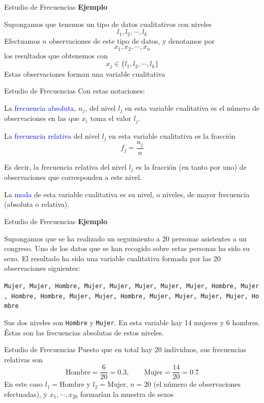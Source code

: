 \documentclass[
  ignorenonframetext,
  aspectratio=169]{beamer}
\newcommand\blue[1]{\textcolor{blue}{#1}}
\begin{document}
\begin{frame}{Estudio de Frecuencias}
\protect\hypertarget{estudio-de-frecuencias-1}{}
\textbf{Ejemplo}

Supongamos que tenemos un tipo de datos cualitativos con niveles
\[l_1,l_2,\cdots,l_k\] Efectuamos \(n\) observaciones de este tipo de
datos, y denotamos por \[x_1,x_2,\cdots,x_n\] los resultados que
obtenemos con \[x_j\in\{l_1, l_2,\cdots, l_k\}\] Estas observaciones
forman una variable cualitativa
\end{frame}

\begin{frame}{Estudio de Frecuencias}
\protect\hypertarget{estudio-de-frecuencias-2}{}
Con estas notaciones:

La \blue{frecuencia absoluta}, \(n_j\), del nivel \(l_j\) en esta
variable cualitativa es el número de observaciones en las que \(x_i\)
toma el valor \(l_j\).

La \blue{frecuencia relativa} del nivel \(l_j\) en esta variable
cualitativa es la fracción \[f_j = \frac{n_j}{n}\]

Es decir, la frecuencia relativa del nivel \(l_j\) es la fracción (en
tanto por uno) de observaciones que corresponden a este nivel.

La \blue{moda} de esta variable cualitativa es su nivel, o niveles, de
mayor frecuencia (absoluta o relativa).
\end{frame}

\begin{frame}[fragile]{Estudio de Frecuencias}
\protect\hypertarget{estudio-de-frecuencias-3}{}
\textbf{Ejemplo}

Supongamos que se ha realizado un seguimiento a 20 personas asistentes a
un congreso. Uno de los datos que se han recogido sobre estas personas
ha sido su sexo. El resultado ha sido una variable cualitativa formada
por las 20 observaciones siguientes:

\texttt{Mujer,\ Mujer,\ Hombre,\ Mujer,\ Mujer,\ Mujer,\ Mujer,\ Mujer,\ Hombre,\ Mujer,\ Hombre,\ Hombre,\ Mujer,\ Mujer,\ Hombre,\ Mujer,\ Mujer,\ Mujer,\ Mujer,\ Hombre}

Sus dos niveles son \texttt{Hombre} y \texttt{Mujer}. En esta variable
hay 14 mujeres y 6 hombres. Éstas son las frecuencias absolutas de estos
niveles.
\end{frame}

\begin{frame}{Estudio de Frecuencias}
\protect\hypertarget{estudio-de-frecuencias-4}{}
Puesto que en total hay 20 individuos, sus frecuencias relativas son
\[\text{Hombre} = \frac{6}{20} = 0.3,\qquad \text{Mujer} = \frac{14}{20} = 0.7\]
En este caso \(l_1 = \text{Hombre}\) y \(l_2 = \text{Mujer}\),
\(n = 20\) (el número de observaciones efectuadas), y
\(x_1,\cdots, x_{20}\) formarían la muestra de sexos
\end{frame}
\end{document}
